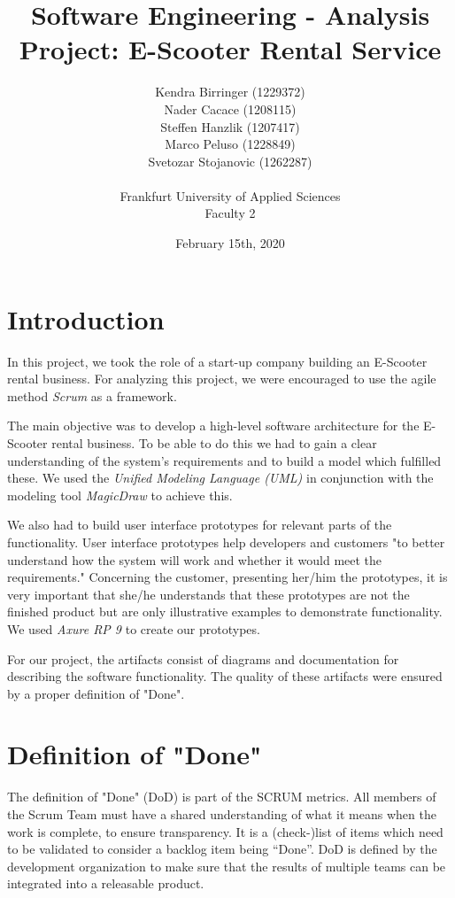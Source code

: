 \documentclass[a4paper, 12pt]{article}
\title{Software Engineering - Analysis\\
Project: E-Scooter Rental Service}
\author{
    Kendra Birringer (1229372)\\
    Nader Cacace (1208115)\\
    Steffen Hanzlik (1207417)\\
    Marco Peluso (1228849)\\
    Svetozar Stojanovic (1262287)\\
    \\
    Frankfurt University of Applied Sciences
    \\ Faculty 2
}
\date{February 15th, 2020}
\begin{document}
\maketitle
\newpage
\tableofcontents

\newpage
\section{Introduction}
In this project, we took the role of a start-up company building an E-Scooter rental business.
For analyzing this project, we were encouraged to use the agile method \emph{Scrum} \cite{scrum} as a framework.

The main objective was to develop a high-level software architecture for the E-Scooter rental business. To be able to do this we had to gain a clear understanding of the system's requirements and to build a model which fulfilled these. We used the \emph{Unified Modeling Language (UML)} \cite{uml} in conjunction with the modeling tool \emph{MagicDraw} \cite{magicdraw} to achieve this.

We also had to build user interface prototypes for relevant parts of the functionality. User interface prototypes help developers and customers "to better understand how the system will work and whether it would meet the requirements." \cite{thoma} Concerning the customer, presenting her/him the prototypes, it is very important that she/he understands that these prototypes are not the finished product but are only illustrative examples to demonstrate functionality. We used \emph{Axure RP 9} \cite{axure} to create our prototypes.

For our project, the artifacts consist of diagrams and documentation for describing the software functionality. The quality of these artifacts were ensured by a proper definition of "Done".

\newpage
\section{Definition of "Done"}
The definition of "Done" (DoD) is part of the SCRUM metrics. All members of the Scrum Team must have a shared understanding of what it means when the work is complete, to ensure transparency. \cite{scrumguide}
It is a (check-)list of items which need to be validated to consider a backlog item being “Done”. DoD is defined by the development organization to make sure that the results of multiple teams can be integrated into a releasable product. \cite{thoma1}
\end{document}
